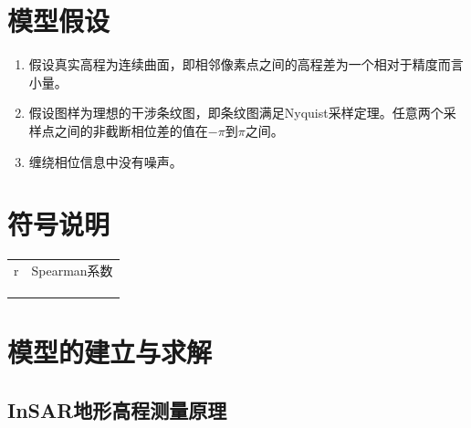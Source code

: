 \documentclass[a4paper]{article}
\begin{document}
	\section{模型假设}
	\begin{enumerate} 
		\item 假设真实高程为连续曲面，即相邻像素点之间的高程差为一个相对于精度而言小量。
		\item 假设图样为理想的干涉条纹图，即条纹图满足Nyquist采样定理。任意两个采样点之间的非截断相位差的值在$ -\pi $到$ \pi $之间。
		\item 缠绕相位信息中没有噪声。
	\end{enumerate}
	
	\section{符号说明}
	\begin{table}[H] %
		\captionsetup{skip=4pt} %
		\centering
		\setlength{\arrayrulewidth}{1.5pt} %
		\begin{tabular}{cc} %
			\hline
			\makebox[0.15\textwidth][c]{符号} & \makebox[0.79\textwidth][c]{说明}  \\ 
			\toprule
			r & Spearman系数  \\
			 &   \\
			 &   \\
			 &   \\
			\hline
		\end{tabular}
	\end{table}
	
	
	\section{模型的建立与求解}
	\subsection{InSAR地形高程测量原理}
\end{document}
